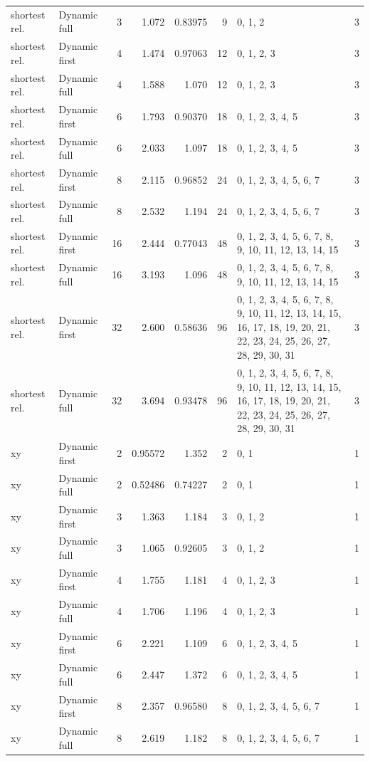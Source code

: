 \documentclass[10pt,a4paper]{article}
\begin{document}
\begin{longtable}{@{}p{23mm}p{29mm}rrrrp{36mm}r@{}}
shortest rel. & Dynamic full & 3 & 1.072 & 0.83975 & 9 & 0, 1, 2 & 3 \\
shortest rel. & Dynamic first & 4 & 1.474 & 0.97063 & 12 & 0, 1, 2, 3 & 3 \\
shortest rel. & Dynamic full & 4 & 1.588 & 1.070 & 12 & 0, 1, 2, 3 & 3 \\
shortest rel. & Dynamic first & 6 & 1.793 & 0.90370 & 18 & 0, 1, 2, 3, 4, 5 & 3 \\
shortest rel. & Dynamic full & 6 & 2.033 & 1.097 & 18 & 0, 1, 2, 3, 4, 5 & 3 \\
shortest rel. & Dynamic first & 8 & 2.115 & 0.96852 & 24 & 0, 1, 2, 3, 4, 5, 6, 7 & 3 \\
shortest rel. & Dynamic full & 8 & 2.532 & 1.194 & 24 & 0, 1, 2, 3, 4, 5, 6, 7 & 3 \\
shortest rel. & Dynamic first & 16 & 2.444 & 0.77043 & 48 & 0, 1, 2, 3, 4, 5, 6, 7, 8, 9, 10, 11, 12, 13, 14, 15 & 3 \\
shortest rel. & Dynamic full & 16 & 3.193 & 1.096 & 48 & 0, 1, 2, 3, 4, 5, 6, 7, 8, 9, 10, 11, 12, 13, 14, 15 & 3 \\
shortest rel. & Dynamic first & 32 & 2.600 & 0.58636 & 96 & 0, 1, 2, 3, 4, 5, 6, 7, 8, 9, 10, 11, 12, 13, 14, 15, 16, 17, 18, 19, 20, 21, 22, 23, 24, 25, 26, 27, 28, 29, 30, 31 & 3 \\
shortest rel. & Dynamic full & 32 & 3.694 & 0.93478 & 96 & 0, 1, 2, 3, 4, 5, 6, 7, 8, 9, 10, 11, 12, 13, 14, 15, 16, 17, 18, 19, 20, 21, 22, 23, 24, 25, 26, 27, 28, 29, 30, 31 & 3 \\
xy & Dynamic first & 2 & 0.95572 & 1.352 & 2 & 0, 1 & 1 \\
xy & Dynamic full & 2 & 0.52486 & 0.74227 & 2 & 0, 1 & 1 \\
xy & Dynamic first & 3 & 1.363 & 1.184 & 3 & 0, 1, 2 & 1 \\
xy & Dynamic full & 3 & 1.065 & 0.92605 & 3 & 0, 1, 2 & 1 \\
xy & Dynamic first & 4 & 1.755 & 1.181 & 4 & 0, 1, 2, 3 & 1 \\
xy & Dynamic full & 4 & 1.706 & 1.196 & 4 & 0, 1, 2, 3 & 1 \\
xy & Dynamic first & 6 & 2.221 & 1.109 & 6 & 0, 1, 2, 3, 4, 5 & 1 \\
xy & Dynamic full & 6 & 2.447 & 1.372 & 6 & 0, 1, 2, 3, 4, 5 & 1 \\
xy & Dynamic first & 8 & 2.357 & 0.96580 & 8 & 0, 1, 2, 3, 4, 5, 6, 7 & 1 \\
xy & Dynamic full & 8 & 2.619 & 1.182 & 8 & 0, 1, 2, 3, 4, 5, 6, 7 & 1 \\

\end{longtable}
\end{document}
